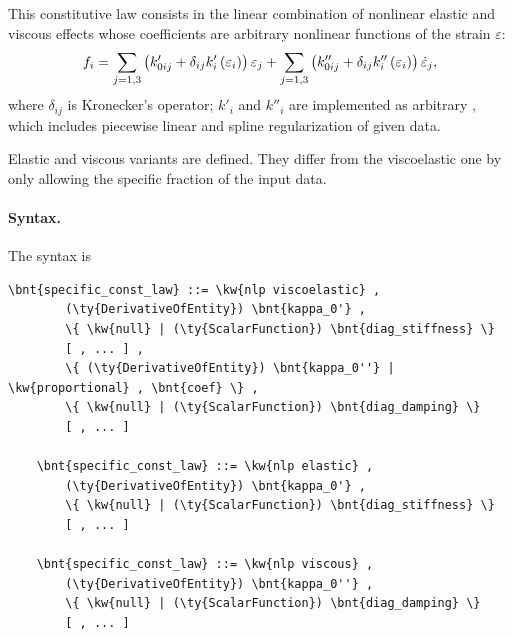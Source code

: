 This constitutive law consists in the linear combination
of nonlinear elastic and viscous effects whose coefficients
are arbitrary nonlinear functions of the strain $\varepsilon$:
\begin{equation}
	f_i = \sum_{j=1,3} \left( 
		k'_{0ij} + \delta_{ij} k_i'\left( \varepsilon_i \right)
	 \right) \varepsilon_j
	+ \sum_{j=1,3} \left( 
		k''_{0ij} + \delta_{ij} k''_i\left( \varepsilon_i \right)
	 \right) \dot{\varepsilon}_j ,
	\label{eq:nlp-cl}
\end{equation}
where $\delta_{ij}$ is Kronecker's operator;
$k'_i$ and $k''_i$ are implemented as arbitrary
,
which includes piecewise linear and spline regularization
of given data.

Elastic and viscous variants are defined.
They differ from the viscoelastic one by only allowing
the specific fraction of the input data.

\paragraph{Syntax.}
The syntax is
\begin{Verbatim}[commandchars=\\\{\}]
    \bnt{specific_const_law} ::= \kw{nlp viscoelastic} ,
        (\ty{DerivativeOfEntity}) \bnt{kappa_0'} ,
        \{ \kw{null} | (\ty{ScalarFunction}) \bnt{diag_stiffness} \}
        [ , ... ] ,
        \{ (\ty{DerivativeOfEntity}) \bnt{kappa_0''} | \kw{proportional} , \bnt{coef} \} ,
        \{ \kw{null} | (\ty{ScalarFunction}) \bnt{diag_damping} \}
        [ , ... ]

    \bnt{specific_const_law} ::= \kw{nlp elastic} ,
        (\ty{DerivativeOfEntity}) \bnt{kappa_0'} ,
        \{ \kw{null} | (\ty{ScalarFunction}) \bnt{diag_stiffness} \}
        [ , ... ]

    \bnt{specific_const_law} ::= \kw{nlp viscous} ,
        (\ty{DerivativeOfEntity}) \bnt{kappa_0''} ,
        \{ \kw{null} | (\ty{ScalarFunction}) \bnt{diag_damping} \}
        [ , ... ]
\end{Verbatim}


